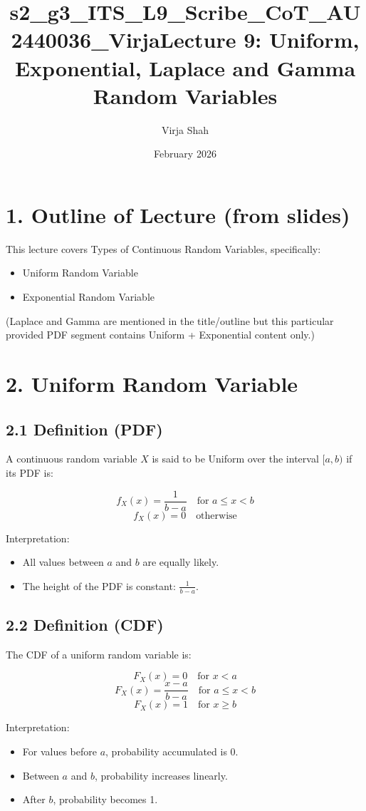 \documentclass{article}
\title{s2_g3_ITS_L9_Scribe_CoT_AU2440036_Virja}
\author{Virja Shah}
\date{February 2026}
\title{Lecture 9: Uniform, Exponential, Laplace and Gamma Random Variables}
\author{}
\date{}
\begin{document}
\maketitle

\section*{1. Outline of Lecture (from slides)}
This lecture covers Types of Continuous Random Variables, specifically:
\begin{itemize}
    \item Uniform Random Variable
    \item Exponential Random Variable
\end{itemize}

\noindent (Laplace and Gamma are mentioned in the title/outline but this particular provided PDF segment contains Uniform + Exponential content only.)


\section*{2. Uniform Random Variable}

\subsection*{2.1 Definition (PDF)}
A continuous random variable $X$ is said to be Uniform over the interval $[a,b)$ if its PDF is:

\[
f_X(x)=\frac{1}{b-a} \quad \text{for } a\le x<b
\]
\[
f_X(x)=0 \quad \text{otherwise}
\]

\noindent Interpretation:
\begin{itemize}
    \item All values between $a$ and $b$ are equally likely.
    \item The height of the PDF is constant: $\frac{1}{b-a}$.
\end{itemize}

\subsection*{2.2 Definition (CDF)}
The CDF of a uniform random variable is:

\[
F_X(x)=0 \quad \text{for } x<a
\]
\[
F_X(x)=\frac{x-a}{b-a} \quad \text{for } a\le x<b
\]
\[
F_X(x)=1 \quad \text{for } x\ge b
\]

\noindent Interpretation:
\begin{itemize}
    \item For values before $a$, probability accumulated is 0.
    \item Between $a$ and $b$, probability increases linearly.
    \item After $b$, probability becomes 1.
\end{itemize}
\end{document}

